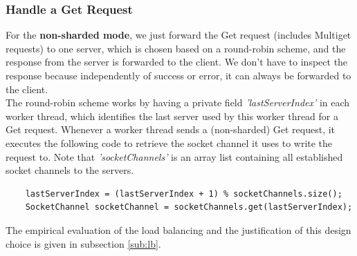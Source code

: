 \subsubsection{Handle a Get Request}
For the \textbf{non-sharded mode}, we just forward the Get request (includes Multiget requests) to one server, which is chosen based on a round-robin scheme, and the response from the server is forwarded to the client. We don't have to inspect the response because independently of success or error, it can always be forwarded to the client. \\
The round-robin scheme works by having a private field \textit{'lastServerIndex'} in each worker thread,  which identifies the last server used by this worker thread for a Get request. Whenever a worker thread sends a (non-sharded) Get request, it executes the following code to retrieve the socket channel it uses to write the request to. Note that \textit{'socketChannels'} is an array list containing all established socket channels to the servers.   
\begin{verbatim} 
    lastServerIndex = (lastServerIndex + 1) % socketChannels.size();
    SocketChannel socketChannel = socketChannels.get(lastServerIndex);
\end{verbatim}
 The empirical evaluation of the load balancing and the justification of this design choice is given in subsection \ref{sub:lb}. \\
  
